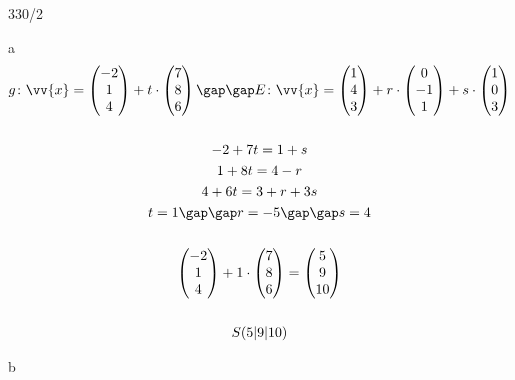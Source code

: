 \begin{exercise}{330/2}
  \item [a]
  \begin{gather*}
    g \colon \vv{x} = \begin{pmatrix}-2 \\ 1 \\ 4\end{pmatrix} + t \cdot \begin{pmatrix}7 \\ 8 \\ 6\end{pmatrix} \gap\gap E \colon \vv{x} = \begin{pmatrix}1 \\ 4 \\ 3\end{pmatrix} + r \cdot \begin{pmatrix}0 \\ -1 \\ 1\end{pmatrix} + s \cdot \begin{pmatrix}1 \\ 0 \\ 3\end{pmatrix} \\\\
    -2 + 7t = 1 + s \\
    1 + 8t = 4 - r \\
    4 + 6t = 3 + r + 3s \\
    t = 1 \gap\gap r = -5 \gap\gap s = 4 \\\\
    \begin{pmatrix}-2 \\ 1 \\ 4\end{pmatrix} + 1 \cdot \begin{pmatrix}7 \\ 8 \\ 6\end{pmatrix} = \begin{pmatrix}5 \\ 9 \\ 10\end{pmatrix} \\\\
    S(5|9|10)
  \end{gather*}
  \item [b]
  \begin{gather*}

\end{gather*}
\end{exercise}
